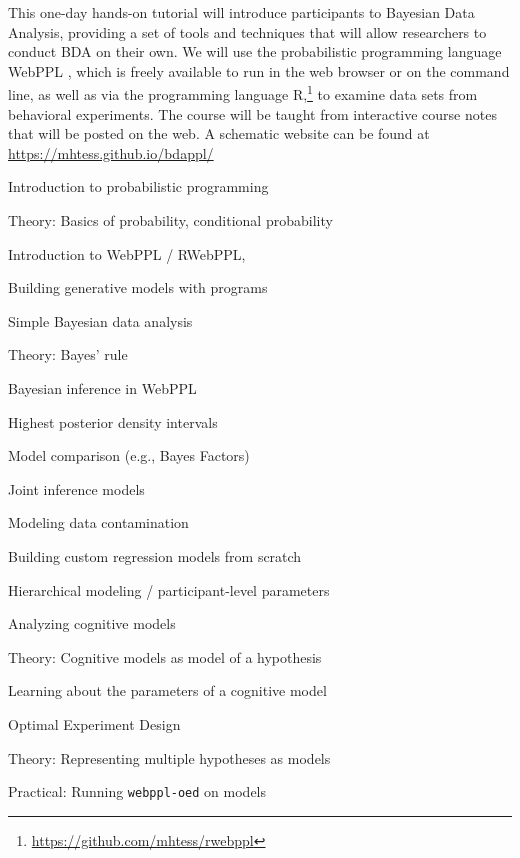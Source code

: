 \documentclass[10pt,letterpaper]{article}
\providecommand{\tightlist}{%
  \setlength{\itemsep}{0pt}\setlength{\parskip}{0pt}}
\newenvironment{itemize*}%
  {\begin{itemize}%
    \setlength{\itemsep}{0pt}%
    \setlength{\parskip}{0pt}}%
  {\end{itemize}}
\begin{document}
This one-day hands-on tutorial will introduce participants to Bayesian Data Analysis, providing a set of tools and techniques that will allow researchers to conduct BDA on their own. 
We will use the probabilistic programming language WebPPL \cite{dippl}, which is freely available to run in the web browser or on the command line, as well as via the programming language R,\footnote{
\url{https://github.com/mhtess/rwebppl}
} to examine data sets from behavioral experiments.
The course will be taught from interactive course notes that will be posted on the web. 
A schematic website can be found at \url{https://mhtess.github.io/bdappl/}

\begin{itemize*}
\tightlist
\item Introduction to probabilistic programming
	\begin{itemize*}
	\item Theory: Basics of probability, conditional probability
	\item Introduction to WebPPL / RWebPPL, 
	\item Building generative models with programs
	\end{itemize*}
\item Simple Bayesian data analysis
	\begin{itemize*}
	\item Theory: Bayes' rule
	\item Bayesian inference in WebPPL
	\item Highest posterior density intervals
	\item Model comparison (e.g., Bayes Factors)
	\end{itemize*}
\item Joint inference models
	\begin{itemize*}
	\item Modeling data contamination
	\item Building custom regression models from scratch 
	\item Hierarchical modeling  / participant-level parameters
	\end{itemize*}
\item Analyzing cognitive models
	\begin{itemize*}
	\item Theory: Cognitive models as model of a hypothesis
	\item Learning about the parameters of a cognitive model
	\end{itemize*}
\item Optimal Experiment Design
	\begin{itemize*}
	\item Theory: Representing multiple hypotheses as models 
	\item Practical: Running \texttt{webppl-oed} on models
	\end{itemize*}
\end{itemize*}
\end{document}
